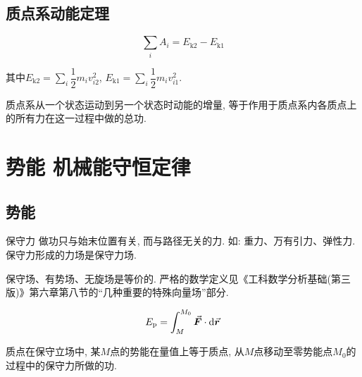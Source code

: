 \subsection{质点系动能定理}

\begin{theorem}[质点系动能定理] \label{C3-th2}
	
	\begin{equation}
		\sum\limits_{i} A_i = E_{\mathrm{k2}} - E_{\mathrm{k1}} \label{C3-eq14}
	\end{equation}
	
	其中$E_{\mathrm{k2}} = \sum\limits_{i} \dfrac{1}{2} m_i v_{i2}^2$, $E_{\mathrm{k1}} = \sum\limits_{i} \dfrac{1}{2} m_i v_{i1}^2$. 
	
	质点系从一个状态运动到另一个状态时动能的增量, 等于作用于质点系内各质点上的所有力在这一过程中做的总功. 
	
\end{theorem}

\section{势能 \quad 机械能守恒定律} \label{3.4}

\subsection{势能}

\begin{definition}[保守力] \label{C3-df2}
	{\heiti 保守力} 做功只与始末位置有关, 而与路径无关的力. 如: 重力、万有引力、弹性力. 保守力形成的力场是保守力场. 
\end{definition}

\begin{note}
	
	保守场、有势场、无旋场是等价的. 严格的数学定义见《工科数学分析基础(第三版)》第六章第八节的“几种重要的特殊向量场”部分. 
	
\end{note}

\begin{definition}[势能] \label{C3-df3}
	
	\begin{equation}
		E_{\mathrm{p}} = \int_{M}^{M_0} \va*{F} \cdot \dd{\va*{r}} \label{C3-eq15}
	\end{equation}
	
	质点在保守立场中, 某$M$点的势能在量值上等于质点, 从$M$点移动至零势能点$M_0$的过程中的保守力所做的功. 
	
\end{definition}

